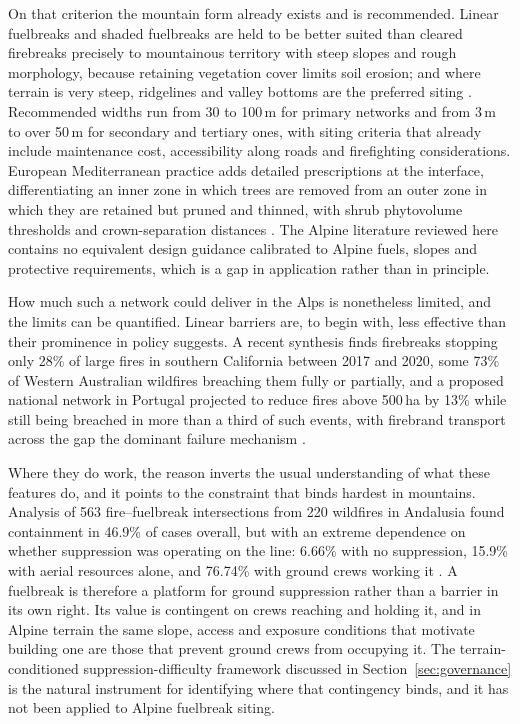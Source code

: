 \documentclass[11pt,a4paper]{article}
\begin{document}
On that criterion the mountain form already exists and is recommended. Linear fuelbreaks and shaded fuelbreaks are held to be better suited than cleared firebreaks precisely to mountainous territory with steep slopes and rough morphology, because retaining vegetation cover limits soil erosion; and where terrain is very steep, ridgelines and valley bottoms are the preferred siting \citep{ascoli_firebreak_2018}. Recommended widths run from 30 to 100\,m for primary networks and from 3\,m to over 50\,m for secondary and tertiary ones, with siting criteria that already include maintenance cost, accessibility along roads and firefighting considerations. European Mediterranean practice adds detailed prescriptions at the interface, differentiating an inner zone in which trees are removed from an outer zone in which they are retained but pruned and thinned, with shrub phytovolume thresholds and crown-separation distances \citep{rigolot_recommendations_2003}. The Alpine literature reviewed here contains no equivalent design guidance calibrated to Alpine fuels, slopes and protective requirements, which is a gap in application rather than in principle.

How much such a network could deliver in the Alps is nonetheless limited, and the limits can be quantified. Linear barriers are, to begin with, less effective than their prominence in policy suggests. A recent synthesis finds firebreaks stopping only 28\% of large fires in southern California between 2017 and 2020, some 73\% of Western Australian wildfires breaching them fully or partially, and a proposed national network in Portugal projected to reduce fires above 500\,ha by 13\% while still being breached in more than a third of such events, with firebrand transport across the gap the dominant failure mechanism \citep{zong_effectiveness_2026}.

Where they do work, the reason inverts the usual understanding of what these features do, and it points to the constraint that binds hardest in mountains. Analysis of 563 fire--fuelbreak intersections from 220 wildfires in Andalusia found containment in 46.9\% of cases overall, but with an extreme dependence on whether suppression was operating on the line: 6.66\% with no suppression, 15.9\% with aerial resources alone, and 76.74\% with ground crews working it \citep{ortega_modeling_2024}. A fuelbreak is therefore a platform for ground suppression rather than a barrier in its own right. Its value is contingent on crews reaching and holding it, and in Alpine terrain the same slope, access and exposure conditions that motivate building one are those that prevent ground crews from occupying it. The terrain-conditioned suppression-difficulty framework discussed in Section~\ref{sec:governance} is the natural instrument for identifying where that contingency binds, and it has not been applied to Alpine fuelbreak siting.
\end{document}
